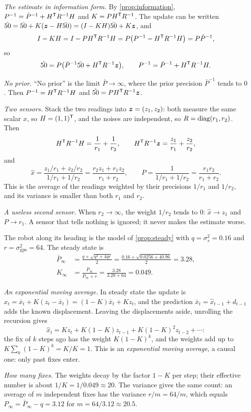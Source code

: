  \emph{The estimate in information form.} By
\cref{prop:information}, $P^{-1}=\bar P^{-1}+H^{\mathsf{T}} R^{-1}H$ and
$K=PH^{\mathsf{T}} R^{-1}$. The update can be written
$\hat{50}=\bar{50}+K(\bm{z}-H\bar{50})=(I-KH)\bar{50}+K\bm{z}$, and
\[
  I-KH=I-PH^{\mathsf{T}} R^{-1}H=P\bigl(P^{-1}-H^{\mathsf{T}} R^{-1}H\bigr)=P\bar P^{-1},
\]
so
\[
  \hat{50}=P\bigl(\bar P^{-1}\bar{50}+H^{\mathsf{T}} R^{-1}\bm{z}\bigr),\qquad
  P^{-1}=\bar P^{-1}+H^{\mathsf{T}} R^{-1}H .
\]

\emph{No prior.} ``No prior'' is the limit $\bar P\to\infty$, where the
prior precision $\bar P^{-1}$ tends to $0$. Then
$P^{-1}=H^{\mathsf{T}} R^{-1}H$ and $\hat{50}=PH^{\mathsf{T}} R^{-1}\bm{z}$.

\emph{Two sensors.} Stack the two readings into $\bm{z}=(z_1,z_2)$: both
measure the same scalar $x$, so $H=(1,1)^{\mathsf{T}}$, and the noises are
independent, so $R=\operatorname{diag}(r_1,r_2)$. Then
\[
  H^{\mathsf{T}} R^{-1}H=\frac1{r_1}+\frac1{r_2},\qquad
  H^{\mathsf{T}} R^{-1}\bm{z}=\frac{z_1}{r_1}+\frac{z_2}{r_2},
\]
and
\[
  \hat x=\frac{z_1/r_1+z_2/r_2}{1/r_1+1/r_2}
  =\frac{r_2z_1+r_1z_2}{r_1+r_2},\qquad
  P=\frac{1}{1/r_1+1/r_2}=\frac{r_1r_2}{r_1+r_2}.
\]
This is the average of the readings weighted by their precisions $1/r_1$
and $1/r_2$, and its variance is smaller than both $r_1$ and $r_2$.

\emph{A useless second sensor.} When $r_2\to\infty$, the weight
$1/r_2$ tends to $0$: $\hat x\to z_1$ and $P\to r_1$. A sensor that tells
nothing is ignored; it never makes the estimate worse.

 The robot along its heading is the model of
\cref{prop:steady} with $q=\sigma_s^2=0.16$ and $r=\sigma_{\mathrm{gps}}^2
=64$. The steady state is
\begin{align*}
  \bar P_\infty&=\frac{q+\sqrt{q^2+4qr}}{2}
  =\frac{0.16+\sqrt{0.0256+40.96}}{2}=3.28,\\
  K_\infty&=\frac{\bar P_\infty}{\bar P_\infty+r}=\frac{3.28}{3.28+64}
  =0.049 .
\end{align*}

\emph{An exponential moving average.} In steady state the update is
$\hat x_t=\bar x_t+K(z_t-\bar x_t)=(1-K)\bar x_t+Kz_t$, and the prediction
$\bar x_t=\hat x_{t-1}+d_{t-1}$ adds the known displacement. Leaving the
displacements aside, unrolling the recursion gives
\[
  \hat x_t=Kz_t+K(1-K)z_{t-1}+K(1-K)^2z_{t-2}+\cdots :
\]
the fix of $k$ steps ago has the weight $K(1-K)^k$, and the weights add up
to $K\sum_k(1-K)^k=K/K=1$. This is an \emph{exponential moving average},
a causal one: only past fixes enter.

\emph{How many fixes.} The weights decay by the factor $1-K$ per step;
their effective number is about $1/K=1/0.049\approx20$. The variance gives
the same count: an average of $m$ independent fixes has the variance
$r/m=64/m$, which equals $P_\infty=\bar P_\infty-q=3.12$ for
$m=64/3.12\approx20.5$.

